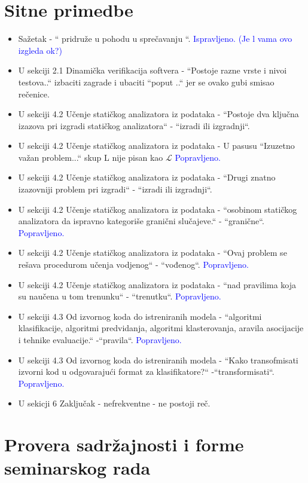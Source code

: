 \documentclass[a4paper]{report}
\newcommand{\odgovor}[1]{\textcolor{blue}{#1}}
\begin{document}
\section{Sitne primedbe}
\begin{itemize}
   \item Sažetak - `` pridruže u pohodu u sprečavanju ``.
   \odgovor{Ispravljeno. (Je l vama ovo izgleda ok?)}
   \item U sekciji 2.1 Dinamička verifikacija softvera - ``Postoje razne vrste i nivoi testova..`` izbaciti zagrade i ubaciti ``poput ..`` jer se ovako gubi smisao rečenice.
   \item U sekciji 4.2 Učenje statičkog analizatora iz podataka - ``Postoje dva ključna izazova pri izgradi statičkog analizatora`` - ``izradi ili izgradnji``.
   \item U sekciji 4.2 Učenje statičkog analizatora iz podataka - U pasusu ``Izuzetno važan problem...`` skup L nije pisan kao $\mathcal{L}$
   \odgovor{Popravljeno.}
   \item U sekciji 4.2 Učenje statičkog analizatora iz podataka - ``Drugi znatno izazovniji problem pri izgradi`` - ``izradi ili izgradnji``.
   \item U sekciji 4.2 Učenje statičkog analizatora iz podataka - ``osobinom statičkog analizatora da ispravno kategoriše granični slučajeve.`` - ``granične``.
   \odgovor{Popravljeno.}
   \item U sekciji 4.2 Učenje statičkog analizatora iz podataka - ``Ovaj problem se rešava procedurom učenja vodjenog`` - ``vođenog``.
   \odgovor{Popravljeno.}
   \item U sekciji 4.2 Učenje statičkog analizatora iz podataka - ``nad pravilima koja su naučena u tom trenunku`` - ``trenutku``.
   \odgovor{Popravljeno.}
   \item U sekciji 4.3 Od izvornog koda do istreniranih modela - ``algoritmi klasifikacije, algoritmi predvidanja, algoritmi klasterovanja, aravila asocijacije i tehnike evaluacije.`` -``pravila``.
   \odgovor{Popravljeno.}
   \item U sekciji 4.3 Od izvornog koda do istreniranih modela - ``Kako transofmisati izvorni kod u odgovarajući format za klasifikatore?`` -``transformisati``.
   \odgovor{Popravljeno.}
   \item U sekicji 6 Zaključak - nefrekventne - ne postoji reč.
\end{itemize}


\section{Provera sadržajnosti i forme seminarskog rada}
\end{document}
